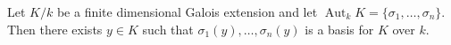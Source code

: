 Let $K/k$ be a finite dimensional Galois extension and let $\operatorname{Aut}_k K = \{\sigma_1, \ldots, \sigma_n\}$. Then there exists $y \in K$ such that $\sigma_1(y), \ldots, \sigma_n(y)$ is a basis for $K$ over $k$.
